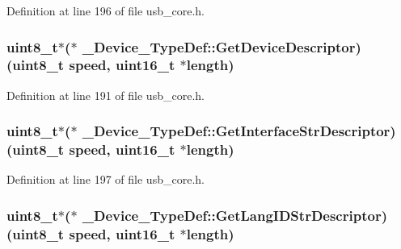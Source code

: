 Definition at line 196 of file usb\-\_\-core.\-h.

\hypertarget{struct___device___type_def_a68a0cf34a64ed3e42393032b469c939d}{
\subsubsection[{Get\-Device\-Descriptor}]{ {\bf uint8\-\_\-t}$\ast$($\ast$ \-\_\-\-Device\-\_\-\-Type\-Def\-::\-Get\-Device\-Descriptor)({\bf uint8\-\_\-t} speed, {\bf uint16\-\_\-t} $\ast${\bf length})}}\label{struct___device___type_def_a68a0cf34a64ed3e42393032b469c939d}


Definition at line 191 of file usb\-\_\-core.\-h.

\hypertarget{struct___device___type_def_a74dcc0a2046bc9b9d6e9cb91a7d95847}{
\subsubsection[{Get\-Interface\-Str\-Descriptor}]{ {\bf uint8\-\_\-t}$\ast$($\ast$ \-\_\-\-Device\-\_\-\-Type\-Def\-::\-Get\-Interface\-Str\-Descriptor)({\bf uint8\-\_\-t} speed, {\bf uint16\-\_\-t} $\ast${\bf length})}}\label{struct___device___type_def_a74dcc0a2046bc9b9d6e9cb91a7d95847}


Definition at line 197 of file usb\-\_\-core.\-h.

\hypertarget{struct___device___type_def_ac35004f6d5bd0ec7378daa704087a354}{
\subsubsection[{Get\-Lang\-I\-D\-Str\-Descriptor}]{ {\bf uint8\-\_\-t}$\ast$($\ast$ \-\_\-\-Device\-\_\-\-Type\-Def\-::\-Get\-Lang\-I\-D\-Str\-Descriptor)({\bf uint8\-\_\-t} speed, {\bf uint16\-\_\-t} $\ast${\bf length})}}\label{struct___device___type_def_ac35004f6d5bd0ec7378daa704087a354}


